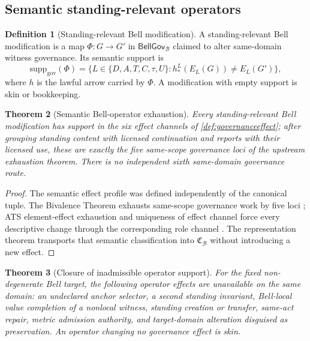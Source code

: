 \documentclass[11pt]{article}
\newtheorem{theorem}{Theorem}[section]
\theoremstyle{definition}
\newtheorem{definition}[theorem]{Definition}
\newcommand{\Bell}{\mathcal{B}}
\newcommand{\BellConstr}{\mathfrak{C}_{\Bell}}
\newcommand{\GovSupp}{\mathrm{supp}_{\mathrm{gov}}}
\newcommand{\BellGov}{\mathsf{BellGov}_{\Bell}}
\begin{document}
\subsection{Semantic standing-relevant operators}

\begin{definition}[Standing-relevant Bell modification]\label{def:belloperator}
A standing-relevant Bell modification is a map $\Phi:G\to G'$ in $\BellGov$ claimed to alter same-domain witness governance. Its semantic support is
\[
\GovSupp(\Phi)=\{L\in\{D,A,T,C,\tau,U\}:h_*^L(E_L(G))\neq E_L(G')\},
\]
where $h$ is the lawful arrow carried by $\Phi$. A modification with empty support is skin or bookkeeping.
\end{definition}

\begin{theorem}[Semantic Bell-operator exhaustion]\label{thm:rolespaceexhaustion}
Every standing-relevant Bell modification has support in the six effect channels of \cref{def:governanceeffect}; after grouping standing content with licensed continuation and reports with their licensed use, these are exactly the five same-scope governance loci of the upstream exhaustion theorem. There is no independent sixth same-domain governance route.
\end{theorem}

\begin{proof}
The semantic effect profile was defined independently of the canonical tuple. The Bivalence Theorem exhausts same-scope governance work by five loci \cite[Theorem~4.2]{MaleyBivalence2026}; ATS element-effect exhaustion and uniqueness of effect channel force every descriptive change through the corresponding role channel \cite[Theorems~4C--4D]{MaleyATS2026}. The representation theorem transports that semantic classification into $\BellConstr$ without introducing a new effect.
\end{proof}

\begin{theorem}[Closure of inadmissible operator support]\label{thm:roleoccupantclosure}
For the fixed non-degenerate Bell target, the following operator effects are unavailable on the same domain: an undeclared anchor selector, a second standing invariant, Bell-local value completion of a nonlocal witness, standing creation or transfer, same-act repair, metric admission authority, and target-domain alteration disguised as preservation. An operator changing no governance effect is skin.
\end{theorem}
\end{document}
